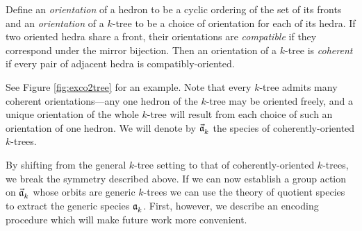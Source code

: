 \documentclass[distribution,draft]{brandiss} %
\numberwithin{section}{chapter}
\numberwithin{figure}{chapter}
\begin{document}
\begin{comment} Don't think we need this after all...
  \begin{definition}\label{def:cycord}
    For a set $A$, define a \emph{cyclic order of $A$} to be a labeling of the cyclic digraph $\overrightarrow{C}_{\abs{A}}$ by $A$ and let $\cyc A$ be the set of such linear orders. Let $\lin A$ be the set of linear orders on $A$. Let $\psi_{A}: \lin A \to \cyc A$ (hereafter denoted simply $\psi$ when the set is unambiguous) send each linear order $\ell$ to the cyclic order obtained by decorating $\overrightarrow{C}_{\abs{A}}$ with $\ell$ in order. (Note that this map is $\abs{A}$-to-one.) Then a \emph{linearization} of a given cyclic order $c \in \cyc A$ is an element of $\psi^{-1} \pbrac{c}$.
  \end{definition}
\end{comment}

\begin{definition}
  \label{def:coktree}
  Define an \emph{orientation} of a hedron to be a cyclic ordering of the set of its fronts and an \emph{orientation} of a $k$-tree to be a choice of orientation for each of its hedra.
  If two oriented hedra share a front, their orientations are \emph{compatible} if they correspond under the mirror bijection.
  Then an orientation of a $k$-tree is \emph{coherent} if every pair of adjacent hedra is compatibly-oriented.
\end{definition}
See Figure \ref{fig:exco2tree} for an example.
Note that every $k$-tree admits many coherent orientations---any one hedron of the $k$-tree may be oriented freely, and a unique orientation of the whole $k$-tree will result from each choice of such an orientation of one hedron.
We will denote by $\vec{\mathfrak{a}}_{k}^{}$ the species of coherently-oriented $k$-trees.

By shifting from the general $k$-tree setting to that of coherently-oriented $k$-trees, we break the symmetry described above.
If we can now establish a group action on $\vec{\mathfrak{a}}_{k}^{}$ whose orbits are generic $k$-trees we can use the theory of quotient species to extract the generic species $\mathfrak{a}_{k}^{}$.
First, however, we describe an encoding procedure which will make future work more convenient.
\end{document}

